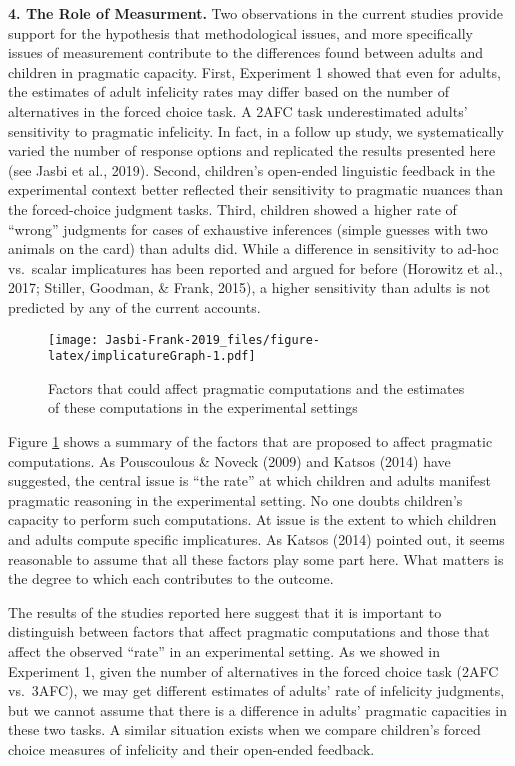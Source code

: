 \documentclass[,man,floatsintext]{apa6}
\begin{document}
\textbf{4. The Role of Measurment.} Two observations in the current studies provide support for the hypothesis that methodological issues, and more specifically issues of measurement contribute to the differences found between adults and children in pragmatic capacity. First, Experiment 1 showed that even for adults, the estimates of adult infelicity rates may differ based on the number of alternatives in the forced choice task. A 2AFC task underestimated adults' sensitivity to pragmatic infelicity. In fact, in a follow up study, we systematically varied the number of response options and replicated the results presented here (see Jasbi et al., 2019). Second, children's open-ended linguistic feedback in the experimental context better reflected their sensitivity to pragmatic nuances than the forced-choice judgment tasks. Third, children showed a higher rate of \enquote{wrong} judgments for cases of exhaustive inferences (simple guesses with two animals on the card) than adults did. While a difference in sensitivity to ad-hoc vs.~scalar implicatures has been reported and argued for before (Horowitz et al., 2017; Stiller, Goodman, \& Frank, 2015), a higher sensitivity than adults is not predicted by any of the current accounts.

\begin{figure}
\centering
\texttt{[image: Jasbi-Frank-2019\_files/figure-latex/implicatureGraph-1.pdf]}
\caption{\label{fig:implicatureGraph}Factors that could affect pragmatic computations and the estimates of these computations in the experimental settings}
\end{figure}

Figure \ref{fig:implicatureGraph} shows a summary of the factors that are proposed to affect pragmatic computations. As Pouscoulous \& Noveck (2009) and Katsos (2014) have suggested, the central issue is \enquote{the rate} at which children and adults manifest pragmatic reasoning in the experimental setting. No one doubts children's capacity to perform such computations. At issue is the extent to which children and adults compute specific implicatures. As Katsos (2014) pointed out, it seems reasonable to assume that all these factors play some part here. What matters is the degree to which each contributes to the outcome.

The results of the studies reported here suggest that it is important to distinguish between factors that affect pragmatic computations and those that affect the observed \enquote{rate} in an experimental setting. As we showed in Experiment 1, given the number of alternatives in the forced choice task (2AFC vs.~3AFC), we may get different estimates of adults' rate of infelicity judgments, but we cannot assume that there is a difference in adults' pragmatic capacities in these two tasks. A similar situation exists when we compare children's forced choice measures of infelicity and their open-ended feedback.
\end{document}
